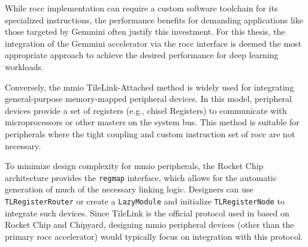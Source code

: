 While \acrshort{rocc} implementation can require a custom software toolchain for its specialized instructions, the performance benefits for demanding applications like those targeted by Gemmini often justify this investment. For this thesis, the integration of the Gemmini accelerator via the \acrshort{rocc} interface is deemed the most appropriate approach to achieve the desired performance for deep learning workloads.

Conversely, the \acrshort{mmio} TileLink-Attached method is widely used for integrating general-purpose memory-mapped peripheral devices. In this model, peripheral devices provide a set of registers (e.g., \acrshort{chisel} Registers) to communicate with microprocessors or other masters on the system bus. This method is suitable for peripherals where the tight coupling and custom instruction set of \acrshort{rocc} are not necessary.

To minimize design complexity for \acrshort{mmio} peripherals, the Rocket Chip architecture provides the \texttt{regmap} interface, which allows for the automatic generation of much of the necessary linking logic. Designers can use \texttt{TLRegisterRouter} or create a \texttt{LazyModule} and initialize \texttt{TLRegisterNode} to integrate such devices. Since TileLink is the official protocol used in  based on Rocket Chip and Chipyard, designing \acrshort{mmio} peripheral devices (other than the primary \acrshort{rocc} accelerator) would typically focus on integration with this protocol.



